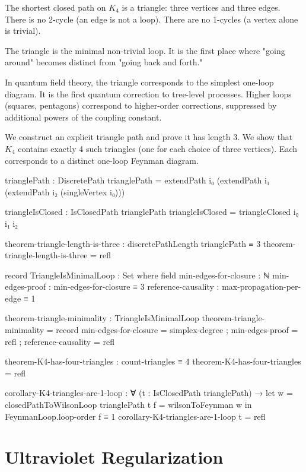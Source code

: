 \documentclass[11pt,a4paper]{book}
\begin{document}
The shortest closed path on $K_4$ is a triangle: three vertices and three edges. There is 
no 2-cycle (an edge is not a loop). There are no 1-cycles (a vertex alone is trivial).

The triangle is the minimal non-trivial loop. It is the first place where "going around" 
becomes distinct from "going back and forth."

In quantum field theory, the triangle corresponds to the simplest one-loop diagram. It is 
the first quantum correction to tree-level processes. Higher loops (squares, pentagons) 
correspond to higher-order corrections, suppressed by additional powers of the coupling 
constant.

We construct an explicit triangle path and prove it has length 3. We show that $K_4$ contains 
exactly 4 such triangles (one for each choice of three vertices). Each corresponds to a 
distinct one-loop Feynman diagram.

\begin{code}
trianglePath : DiscretePath
trianglePath = extendPath i₀ (extendPath i₁ (extendPath i₂ (singleVertex i₀)))

triangleIsClosed : IsClosedPath trianglePath
triangleIsClosed = triangleClosed i₀ i₁ i₂

theorem-triangle-length-is-three : discretePathLength trianglePath ≡ 3
theorem-triangle-length-is-three = refl

record TriangleIsMinimalLoop : Set where
  field
    min-edges-for-closure : ℕ
    min-edges-proof : min-edges-for-closure ≡ 3
    reference-causality : max-propagation-per-edge ≡ 1

theorem-triangle-minimality : TriangleIsMinimalLoop
theorem-triangle-minimality = record
  { min-edges-for-closure = simplex-degree
  ; min-edges-proof = refl
  ; reference-causality = refl
  }

theorem-K4-has-four-triangles : count-triangles ≡ 4
theorem-K4-has-four-triangles = refl

corollary-K4-triangles-are-1-loop : ∀ (t : IsClosedPath trianglePath) →
  let w = closedPathToWilsonLoop trianglePath t
      f = wilsonToFeynman w
  in FeynmanLoop.loop-order f ≡ 1
corollary-K4-triangles-are-1-loop t = refl
\end{code}

\chapter{Ultraviolet Regularization}
\end{document}
